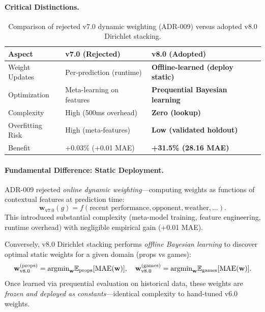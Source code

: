 \paragraph{Critical Distinctions.}
\begin{table}[htbp]
\centering
\caption[ADR-009 dynamic weights vs v8.0 Dirichlet comparison]{Comparison of rejected v7.0 dynamic weighting (ADR-009) versus adopted v8.0 Dirichlet stacking.}
\label{tab:adr009-vs-dirichlet}
\begin{tabular}{@{}lll@{}}
\toprule
\textbf{Aspect} & \textbf{v7.0 (Rejected)} & \textbf{v8.0 (Adopted)} \\
\midrule
Weight Updates & Per-prediction (runtime) & \textbf{Offline-learned (deploy static)} \\
Optimization & Meta-learning on features & \textbf{Prequential Bayesian learning} \\
Complexity & High (500ms overhead) & \textbf{Zero (lookup)} \\
Overfitting Risk & High (meta-features) & \textbf{Low (validated holdout)} \\
Benefit & +0.03\% (+0.01 MAE) & \textbf{+31.5\% (28.16 MAE)} \\
\bottomrule
\end{tabular}
\end{table}

\paragraph{Fundamental Difference: Static Deployment.}
ADR-009 rejected \emph{online dynamic weighting}---computing weights as functions of contextual features at prediction time:
\begin{equation}
\mathbf{w}_{\text{v7.0}}(g) = f(\text{recent performance}, \text{opponent}, \text{weather}, \ldots).
\end{equation}
This introduced substantial complexity (meta-model training, feature engineering, runtime overhead) with negligible empirical gain (+0.01 MAE).

Conversely, v8.0 Dirichlet stacking performs \emph{offline Bayesian learning} to discover optimal static weights for a given domain (props vs games):
\begin{equation}
\mathbf{w}_{\text{v8.0}}^{\text{(props)}} = \text{argmin}_{\mathbf{w}} \mathbb{E}_{\text{props}}[\text{MAE}(\mathbf{w})], \quad \mathbf{w}_{\text{v8.0}}^{\text{(games)}} = \text{argmin}_{\mathbf{w}} \mathbb{E}_{\text{games}}[\text{MAE}(\mathbf{w})].
\end{equation}
Once learned via prequential evaluation on historical data, these weights are \emph{frozen and deployed as constants}---identical complexity to hand-tuned v6.0 weights.

